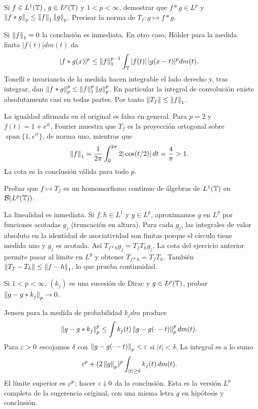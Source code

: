 \begin{ejercicio}\label{ej:v4-l08-2}
Si $f\in L^1(\mathbb T)$, $g\in L^p(\mathbb T)$ y $1<p<\infty$, demostrar que $f*g\in L^p$ y $\left\lVert f*g\right\rVert_p\leq\left\lVert f\right\rVert_1\left\lVert g\right\rVert_p$. Precisar la norma de $T_f:g\mapsto f*g$.
\end{ejercicio}
\begin{solucion}
Si $\left\lVert f\right\rVert_1=0$ la conclusión es inmediata. En otro caso, Hölder para la medida finita $|f(t)|dm(t)$ da
\[
 |f*g(x)|^p\leq\left\lVert f\right\rVert_1^{p-1}\int_\mathbb T |f(t)|\,|g(x-t)|^pdm(t).
\]
Tonelli e invariancia de la medida hacen integrable el lado derecho y, tras integrar, dan $\left\lVert f*g\right\rVert_p^p\leq\left\lVert f\right\rVert_1^p\left\lVert g\right\rVert_p^p$. En particular la integral de convolución existe absolutamente casi en todas partes. Por tanto $\left\lVert T_f\right\rVert\leq\left\lVert f\right\rVert_1$.

La igualdad afirmada en el original es falsa en general. Para $p=2$ y $f(t)=1+e^{it}$, Fourier muestra que $T_f$ es la proyección ortogonal sobre $\operatorname{span}\{1,e^{it}\}$, de norma uno, mientras que
\[
 \left\lVert f\right\rVert_1=\frac1{2\pi}\int_0^{2\pi}2|\cos(t/2)|\,dt=\frac4\pi>1.
\]
La cota es la conclusión válida para todo $p$.
\end{solucion}

\begin{ejercicio}\label{ej:v4-l08-3}
Probar que $f\mapsto T_f$ es un homomorfismo continuo de álgebras de $L^1(\mathbb T)$ en $\mathcal B(L^p(\mathbb T))$.
\end{ejercicio}
\begin{solucion}
La linealidad es inmediata. Si $f,h\in L^1$ y $g\in L^p$, aproximamos $g$ en $L^p$ por funciones acotadas $g_j$ (truncación en altura). Para cada $g_j$, las integrales de valor absoluto en la identidad de asociatividad son finitas porque el círculo tiene medida uno y $g_j$ es acotada. Así $T_{f*h}g_j=T_fT_hg_j$. La cota del ejercicio anterior permite pasar al límite en $L^p$ y obtener $T_{f*h}=T_fT_h$. También $\left\lVert T_f-T_h\right\rVert\leq\left\lVert f-h\right\rVert_1$, lo que prueba continuidad.
\end{solucion}

\begin{ejercicio}\label{ej:v4-l08-4}
Si $1<p<\infty$, $(k_j)$ es una sucesión de Dirac y $g\in L^p(\mathbb T)$, probar $\left\lVert g-g*k_j\right\rVert_p\to0$.
\end{ejercicio}
\begin{solucion}
Jensen para la medida de probabilidad $k_jdm$ produce
\[
\left\lVert g-g*k_j\right\rVert_p^p\leq\int k_j(t)\left\lVert g-g(\cdot-t)\right\rVert_p^pdm(t).
\]
Para $\varepsilon>0$ escojamos $\delta$ con $\left\lVert g-g(\cdot-t)\right\rVert_p<\varepsilon$ si $|t|<\delta$. La integral es a lo sumo
\[
 \varepsilon^p+(2\left\lVert g\right\rVert_p)^p\int_{|t|\geq\delta}k_j(t)\,dm(t).
\]
El límite superior es $\varepsilon^p$; hacer $\varepsilon\downarrow0$ da la conclusión. Esta es la versión $L^p$ completa de la sugerencia original, con una misma letra $g$ en hipótesis y conclusión.
\end{solucion}

